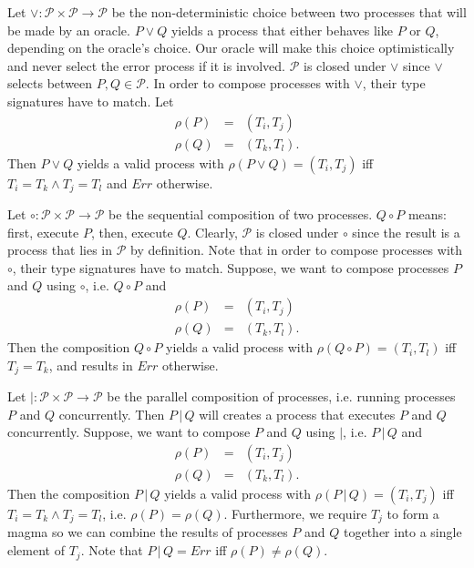 Let $\vee \colon \mathcal{P} \times \mathcal{P} \to \mathcal{P}$ be the non-deterministic choice between two processes that will be made by an oracle. $P \vee Q$ yields a process that either behaves like $P$ or $Q$, depending on the oracle's choice. Our oracle will make this choice optimistically and never select the error process if it is involved. $\mathcal{P}$ is closed under $\vee$ since $\vee$ selects between $P, Q \in \mathcal{P}$. In order to compose processes with $\vee$, their type signatures have to match. Let
\begin{eqnarray*}
  \rho \left( P \right) & = & \left( T_i, T_j \right) \\
  \rho \left( Q \right) & = & \left( T_k, T_l \right).
\end{eqnarray*}
Then $P \vee Q$ yields a valid process with $\rho \left( P \vee Q \right) = \left( T_i, T_j \right)$ iff $T_i = T_k \wedge T_j = T_l$ and $Err$ otherwise. 

Let $\circ \colon \mathcal{P} \times \mathcal{P} \to \mathcal{P}$ be the sequential composition of two processes. $Q \circ P$ means: first, execute $P$, then, execute $Q$. Clearly, $\mathcal{P}$ is closed under $\circ$ since the result is a process that lies in $\mathcal{P}$ by definition. Note that in order to compose processes with $\circ$, their type signatures have to match. Suppose, we want to compose processes $P$ and $Q$ using $\circ$, i.e. $Q \circ P$ and
\begin{eqnarray*}
  \rho \left( P \right) & = & \left( T_i, T_j \right) \\
  \rho \left( Q \right) & = & \left( T_k, T_l \right).
\end{eqnarray*}
Then the composition $Q \circ P$ yields a valid process with $\rho \left( Q \circ P \right) = \left( T_i, T_l \right)$ iff $T_j = T_k$, and results in $Err$ otherwise. 

Let $| \colon \mathcal{P} \times \mathcal{P} \to \mathcal{P}$ be the parallel composition of processes, i.e. running processes $P$ and $Q$ concurrently. Then $P \,|\, Q$ will creates a process that executes $P$ and $Q$ concurrently. Suppose, we want to compose $P$ and $Q$ using $|$, i.e. $P \,|\, Q$ and
\begin{eqnarray*}
  \rho \left( P \right) & = & \left( T_i, T_j \right) \\
  \rho \left( Q \right) & = & \left( T_k, T_l \right).
\end{eqnarray*}
Then the composition $P \,|\, Q$ yields a valid process with $\rho \left( P \,|\, Q \right) = \left( T_i, T_j \right)$ iff $T_i = T_k \wedge T_j = T_l$, i.e. $\rho \left( P \right) = \rho \left( Q \right)$. Furthermore, we require $T_j$ to form a magma so we can combine the results of processes $P$ and $Q$ together into a single element of $T_j$. Note that $P \,|\, Q = Err$ iff $\rho \left( P \right) \neq \rho \left( Q \right)$.


